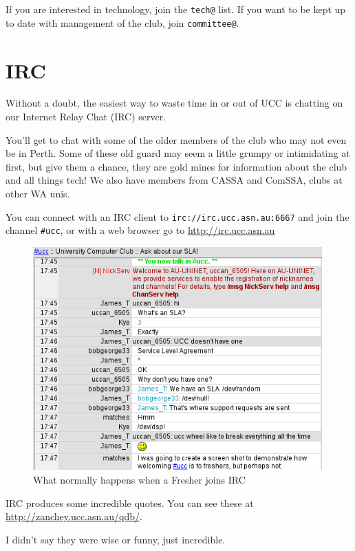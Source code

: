 If you are interested in technology, join the \texttt{tech@} list. If you want to be kept up to date with management of the club, join \texttt{committee@}.



\section{IRC}

Without a doubt, the easiest way to waste time in or out of UCC 
is chatting on our Internet Relay Chat (IRC) server. 

You'll get to chat with some of the older members of the club who 
may not even be in Perth. Some of these old guard may seem a 
little grumpy or intimidating at first, but give them a chance, they 
are gold mines for information about the club and all things tech! 
We also have members from CASSA and ComSSA, clubs at other WA unis. 

You can connect with an IRC client to \texttt{irc://irc.ucc.asn.au:6667} 
and join the channel \texttt{\#ucc}, or with a web browser go to 
\url{http://irc.ucc.asn.au}

\begin{figure}[H]
	\centering
	\includegraphics[width=0.99\textwidth]{figures/webirc2.png}
	\caption{What normally happens when a Fresher joins IRC}
	\label{webirc.jpg}
\end{figure}

IRC produces some incredible quotes. You can see these at \url{http://zanchey.ucc.asn.au/qdb/}.

I didn't say they were wise or funny, just incredible.



